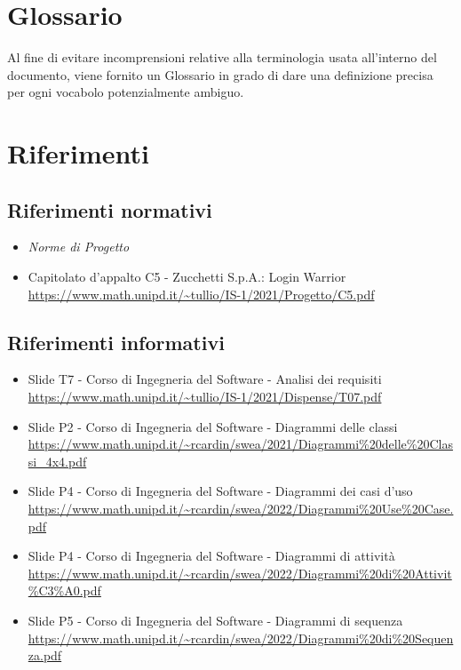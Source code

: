 \section{Glossario}
Al fine di evitare incomprensioni relative alla terminologia usata all'interno del documento, viene fornito un Glossario in grado di dare una definizione precisa per ogni vocabolo potenzialmente ambiguo.

\section{Riferimenti}
\subsection{Riferimenti normativi}
\begin{itemize}
  \item \textit{Norme di Progetto}
  \item Capitolato d'appalto C5 - Zucchetti S.p.A.: Login Warrior \\
  \url{https://www.math.unipd.it/~tullio/IS-1/2021/Progetto/C5.pdf}
\end{itemize}

\subsection{Riferimenti informativi}
\begin{itemize}
  \item Slide T7 - Corso di Ingegneria del Software - Analisi dei requisiti \\
  \url{https://www.math.unipd.it/~tullio/IS-1/2021/Dispense/T07.pdf}
  \item Slide P2 - Corso di Ingegneria del Software - Diagrammi delle classi \\
  \url{https://www.math.unipd.it/~rcardin/swea/2021/Diagrammi%20delle%20Classi_4x4.pdf}
  \item Slide P4 - Corso di Ingegneria del Software - Diagrammi dei casi d'uso \\
  \url{https://www.math.unipd.it/~rcardin/swea/2022/Diagrammi%20Use%20Case.pdf}
  \item Slide P4 - Corso di Ingegneria del Software - Diagrammi di attività \\
  \url{https://www.math.unipd.it/~rcardin/swea/2022/Diagrammi%20di%20Attivit\%C3\%A0.pdf}  %
  \item Slide P5 - Corso di Ingegneria del Software - Diagrammi di sequenza \\
  \url{https://www.math.unipd.it/~rcardin/swea/2022/Diagrammi%20di%20Sequenza.pdf}
\end{itemize}
